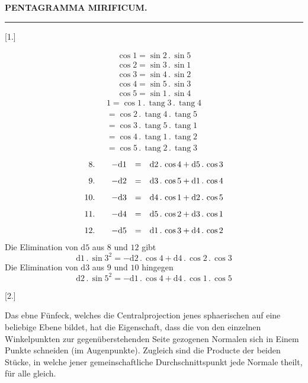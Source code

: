 \clearpage{}

\begin{center}
\textbf{PENTAGRAMMA MIRIFICUM.}

\rule{39.96bp}{0.35pt}
\end{center}

\begin{center}
\resizebox{.94\linewidth}{!}{}
\end{center}


\par\medskip{}\centerline{[1.]}\nobreak\smallskip
\[
\begin{gathered}
\cos 1=\sin 2\, .\,\sin 5\\[8pt]
\cos 2=\sin 3\, .\,\sin 1\\[8pt]
\cos 3=\sin 4\, .\,\sin 2\\[8pt]
\cos 4=\sin 5\, .\,\sin 3\\[8pt]
\cos 5=\sin 1\, .\,\sin 4
\end{gathered}
\]
\[
\begin{gathered}
1=\cos 1\, .\,\operatorname{tang}3\, .\,\operatorname{tang}4\\[8pt]
 =\cos 2\, .\,\operatorname{tang}4\, .\,\operatorname{tang}5\\[8pt]
 =\cos 3\, .\,\operatorname{tang}5\, .\,\operatorname{tang}1\\[8pt]
 =\cos 4\, .\,\operatorname{tang}1\, .\,\operatorname{tang}2\\[8pt]
 =\cos 5\, .\,\operatorname{tang}2\, .\,\operatorname{tang}3
\end{gathered}
\]
\[
\begin{array}{r@{\qquad}rcl}
8.&-\mathrm{d}1&=&\mathrm{d}2\, .\,\cos 4+\mathrm{d}5\, .\,\cos 3\\[8pt]
9.&-\mathrm{d}2&=&\mathrm{d}3\, .\,\cos 5+\mathrm{d}1\, .\,\cos 4\\[8pt]
10.&-\mathrm{d}3&=&\mathrm{d}4\, .\,\cos 1+\mathrm{d}2\, .\,\cos 5\\[8pt]
11.&-\mathrm{d}4&=&\mathrm{d}5\, .\,\cos 2+\mathrm{d}3\, .\,\cos 1\\[8pt]
12.&-\mathrm{d}5&=&\mathrm{d}1\, .\,\cos 3+\mathrm{d}4\, .\,\cos 2
\end{array}
\]
Die Elimination von $\mathrm{d}5$ aus $8$ und $12$ gibt
\[
\mathrm{d}1\, .\,\sin 3^2=-\mathrm{d}2\, .\,\cos 4+\mathrm{d}4\, .\,\cos 2\, .\,\cos 3
\]
Die Elimination von $\mathrm{d}3$ aus $9$ und $10$ hingegen
\[
\mathrm{d}2\, .\,\sin 5^2=-\mathrm{d}1\, .\,\cos 4+\mathrm{d}4\, .\,\cos 1\, .\,\cos 5
\]
\par\medskip{}\centerline{[2.]}\nobreak\smallskip
Das ebne Fünfeck, welches die Centralprojection jenes sphaerischen auf
eine beliebige Ebene bildet, hat die Eigenschaft, dass die von den einzelnen Winkelpunkten zur gegenüberstehenden Seite gezogenen Normalen sich in Einem
Punkte schneiden (im Augenpunkte). Zugleich sind die Producte der beiden
Stücke, in welche jener gemeinschaftliche Durchschnittspunkt jede Normale
theilt, für alle gleich.

